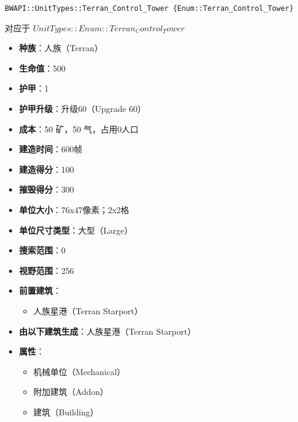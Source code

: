 \begin{tcolorbox}[colback=white, colframe=black!60!white, title=Terran\_Control\_Tower(), arc=0mm]
    \begin{verbatim}
BWAPI::UnitTypes::Terran_Control_Tower {Enum::Terran_Control_Tower}
    \end{verbatim}
    对应于  $ UnitTypes::Enum::Terran_Control_Tower $ 
    \begin{itemize}
        \item \textbf{种族}：人族（Terran）
        \item \textbf{生命值}：500
        \item \textbf{护甲}：1
        \item \textbf{护甲升级}：升级60（Upgrade 60）
        \item \textbf{成本}：50 矿，50 气，占用0人口
        \item \textbf{建造时间}：600帧
        \item \textbf{建造得分}：100
        \item \textbf{摧毁得分}：300
        \item \textbf{单位大小}：76x47像素；2x2格
        \item \textbf{单位尺寸类型}：大型（Large）
        \item \textbf{搜索范围}：0
        \item \textbf{视野范围}：256
        \item \textbf{前置建筑}：
            \begin{itemize}
                \item 人族星港（Terran Starport）
            \end{itemize}
        \item \textbf{由以下建筑生成}：人族星港（Terran Starport）
        \item \textbf{属性}：
            \begin{itemize}
                \item 机械单位（Mechanical）
                \item 附加建筑（Addon）
                \item 建筑（Building）
            \end{itemize}
    \end{itemize}
\end{tcolorbox}

